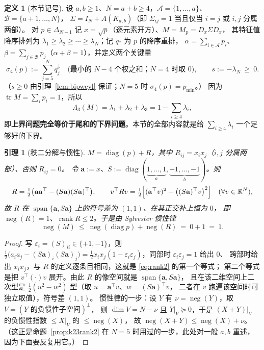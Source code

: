 \documentclass[UTF8,11pt]{ctexart}
\newtheorem{lemma}[theorem]{引理}
\theoremstyle{definition}
\newtheorem{definition}[theorem]{定义}
\newcommand{\Lam}{\Lambda}
\newcommand{\tr}{\operatorname{tr}}
\newcommand{\rank}{\operatorname{rank}}
\newcommand{\R}{\mathbb{R}}
\begin{document}
\begin{definition}[本节记号]\label{def:bip}
设 $a,b\ge1$、$N=a+b\ge4$，$\mathcal A=\{1,\dots,a\}$、$\mathcal B=\{a+1,\dots,N\}$，
$\Sigma=I_N+A(K_{a,b})$（即 $\Sigma_{ij}=1$ 当且仅当 $i=j$ 或 $i,j$ 分属两部）。
对 $p\in\Delta_{N-1}$ 记 $x=\sqrt p$（逐元素开方）、$M=M_p=D_x\Sigma D_x$，
其特征值降序排列为 $\lambda_1\ge\lambda_2\ge\cdots\ge\lambda_N$；记 $q^\downarrow$ 为 $p$ 的降序重排，
$\alpha=\sum_{i\in\mathcal A}p_i$、$\beta=\sum_{j\in\mathcal B}p_j$（$\alpha+\beta=1$），并定义两个关键量
\begin{equation}\label{eq:sig4}
\sigma_4(p):=\sum_{j=5}^{N}q^\downarrow_j\quad\bigl(\text{最小的 }N-4\text{ 个权之和；}N=4\text{ 时取 }0\bigr),
\qquad s:=-\lambda_N\ \ge\ 0 .
\end{equation}
（$s\ge0$ 由引理~\ref{lem:bipweyl} 保证；$N=5$ 时 $\sigma_4(p)=p_{\min}$。）
因为 $\tr M=\sum_ip_i=1$，所以
\begin{equation}\label{eq:tail}
\Lam_3(M)=\lambda_1+\lambda_2+\lambda_3=1-\sum_{i\ge4}\lambda_i ,
\end{equation}
即\textbf{上界问题完全等价于尾和的下界问题}。本节的全部内容就是给 $\sum_{i\ge4}\lambda_i$ 一个足够好的下界。
\end{definition}

\begin{lemma}[秩二分解与惯性]\label{lem:biprank}
$M=\operatorname{diag}(p)+R$，其中 $R_{ij}=x_ix_j$（$i,j$ 分属两部）、否则 $R_{ij}=0$。
令 $\mathbf a:=x$、$S:=\operatorname{diag}(\underbrace{1,\dots,1}_{a},\underbrace{-1,\dots,-1}_{b})$。则
\begin{equation}\label{eq:rank2}
R=\tfrac12\bigl(\mathbf a\mathbf a^\top-(S\mathbf a)(S\mathbf a)^\top\bigr),\qquad
v^\top Rv=\tfrac12\Bigl[(\mathbf a^\top v)^2-\bigl((S\mathbf a)^\top v\bigr)^2\Bigr]\quad(\forall v\in\R^N),
\end{equation}
故 $R$ 在 $\operatorname{span}\{\mathbf a,S\mathbf a\}$ 上的符号差为 $(1,1)$、在其正交补上恒为 $0$，
即 $\operatorname{neg}(R)=1$、$\rank R\le2$。于是由 Sylvester 惯性律
\[
\operatorname{neg}(M)\ \le\ \operatorname{neg}(\operatorname{diag}p)+\operatorname{neg}(R)\ =\ 0+1\ =\ 1 .
\]
\end{lemma}

\begin{proof}
写 $\varepsilon_i=(S)_{ii}\in\{+1,-1\}$，则 $\frac12\bigl(a_ia_j-(S\mathbf a)_i(S\mathbf a)_j\bigr)
=\frac12x_ix_j(1-\varepsilon_i\varepsilon_j)$，同部时 $\varepsilon_i\varepsilon_j=1$ 给出 $0$、
跨部时给出 $x_ix_j$，与 $R$ 的定义逐条目相同，这就是 \eqref{eq:rank2} 的第一个等式；
第二个等式是把 $v^\top(\cdot)v$ 展开。由此 $R$ 的像空间就是 $\operatorname{span}\{\mathbf a,S\mathbf a\}$，
且在该二维空间上二次型是 $\frac12(u^2-w^2)$ 型（取 $u=\mathbf a^\top v$、$w=(S\mathbf a)^\top v$，
二者在 $v$ 跑遍该空间时可独立取值），符号差 $(1,1)$。
惯性律的一步：设 $Y$ 有 $\nu=\operatorname{neg}(Y)$，取 $V=(\text{$Y$ 的负惯性子空间})^\perp$，
则 $\dim V=N-\nu$ 且 $Y|_V\succeq0$，于是 $(X+Y)|_V$ 的负惯性指数 $\le X|_V$ 的 $\le\operatorname{neg}(X)$，
故 $\operatorname{neg}(X+Y)\le\operatorname{neg}(X)+\nu$。
（这正是命题~\ref{prop:k23rank2} 在 $N=5$ 时用过的一步，此处对一般 $a,b$ 重述，因为下面要反复用它。）
\end{proof}
\end{document}
